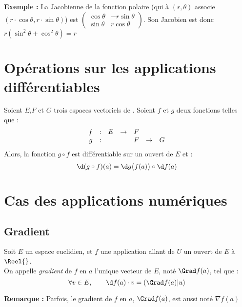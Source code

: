 \documentclass[11pt,a4paper,fleqn,pdftex]{report}
\begin{document}
\textbf{Exemple :} La Jacobienne de la fonction polaire (qui à $(r,\theta )$ associe $(r\cdot \cos{\theta} , r\cdot \sin{\theta} )$) est $\begin{pmatrix}
\cos{\theta} & -r\sin{\theta} \\
\sin{\theta} & r\cos{\theta}
\end{pmatrix}$. Son Jacobien est donc $r\left( \sin^2{\theta} + \cos^2{\theta} \right)=r$

\section{Opérations sur les applications différentiables} %
\label{sec:operations_sur_les_applications_differentiables}
\begin{itheorem}
Soient $E$,$F$ et $G$ trois espaces vectoriels   de .\newline
Soient $f$ et $g$ deux fonctions telles que :
\[
    \begin{array}{r c l c l c l}
    f &:& E &\to& F \\
    g &:& & & F & \to & G 
    \end{array}
\]
Alors, la fonction $g \circ f$ est différentiable sur un ouvert de $E$ et :
     \begin{equation}
     \d (g\circ f)(a) = \d g\big( f(a)\big) \circ \d f(a)
     \end{equation}
     
\end{itheorem}
\section{Cas des applications numériques} %
\label{sec:cas_des_applications_numeriques}
\subsection{Gradient} %
\label{sub:gradient}
\begin{dfn}[Gradient]
     Soit $E$ un espace euclidien, et $f$ une application allant de $U$ un ouvert de $E$ à $\Reel{}$. \\
     On appelle \emph{gradient} de $f$ en $a$ l'unique vecteur de $E$, noté $\Grad f(a)$, tel que :
     \begin{equation}
     \forall v\in E,\qquad \d f(a)\cdot v = \left( \Grad f(a) | u \right) 
     \end{equation}
\end{dfn}
\textbf{Remarque :} Parfois, le gradient de $f$ en $a$, $\Grad f(a)$, est aussi noté $\nabla f(a)$
\end{document}
